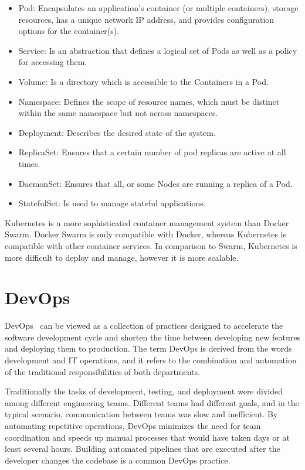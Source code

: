 \begin{itemize}
    \setlength\itemsep{0em}
    \item Pod: Encapsulates an application's container (or multiple containers),
    storage resources, has a unique network IP address, and provides configuration options for the container(s).
    \item Service: Is an abstraction that defines a logical set of Pods as well as a policy for accessing them.
    \item Volume: Is a directory which is accessible to the
    Containers in a Pod.
    \item Namespace: Defines the scope of resource names, which must be distinct within the same namespace but not across namespaces.
    \item Deployment: Describes the desired state of the system.
    \item ReplicaSet: Ensures that a certain number of pod replicas are active at all times.
    \item DaemonSet: Ensures that all, or some Nodes are running a replica of a Pod.
    \item StatefulSet: Is used to manage stateful applications.
\end{itemize}

Kubernetes is a more sophisticated container management system than Docker Swarm.
Docker Swarm is only compatible with Docker, whereas Kubernetes is compatible with other container services.
In comparison to Swarm, Kubernetes is more difficult to deploy and manage, however it is more scalable.

\section{DevOps} %
\label{sec:dev_ops}

DevOps~\cite{devops} can be viewed as a collection of practices designed to accelerate the software development cycle and shorten the time between developing new features and deploying them to production.
The term DevOps is derived from the words development and IT operations, and it refers to the combination and automation of the traditional responsibilities of both departments.

Traditionally the tasks of development, testing, and deployment were divided among different engineering teams.
Different teams had different goals, and in the typical scenario, communication between teams was slow and inefficient.
By automating repetitive operations, DevOps minimizes the need for team coordination and speeds up manual processes that would have taken days or at least several hours.
Building automated pipelines that are executed after the developer changes the codebase is a common DevOps practice.

